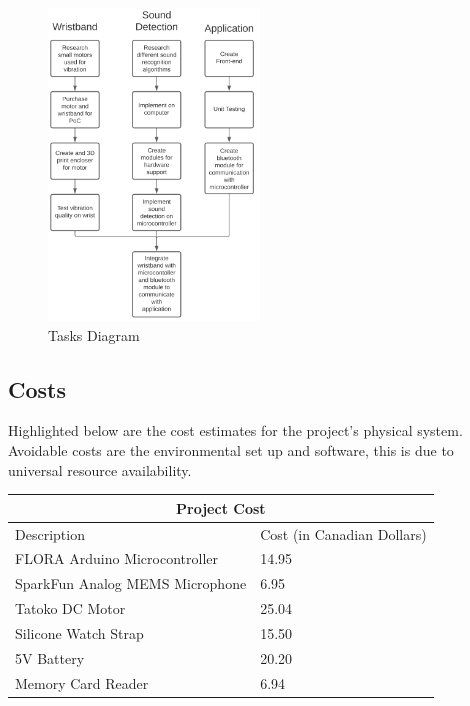 \documentclass[12pt]{article}
\begin{document}
\begin{figure}[H]
  \begin{center}
   \includegraphics[width=0.5\textwidth, scale=0.5]{planning_dev_process.png}
  \caption{Tasks Diagram}
  \label{taskDiagram} 
  \end{center}
  \end{figure}

\subsection{Costs}
Highlighted below are the cost estimates for the project's physical system. Avoidable costs are the environmental set up and software, this is due to universal resource availability.
\center

\begin{tabular}{ |p{6cm}||p{3cm}| }
 \hline
 \multicolumn{2}{|c|}{Project Cost} \\
 \hline
 Description & Cost (in Canadian Dollars) \\
 \hline
FLORA Arduino Microcontroller   &  14.95    \\
 \hline
SparkFun Analog MEMS Microphone &   6.95  \\
\hline
Tatoko DC Motor &   25.04  \\
\hline
Silicone Watch Strap &   15.50  \\
\hline
5V Battery &   20.20  \\
\hline
Memory Card Reader &  6.94 \\
\hline

\end{tabular}
\end{document}
